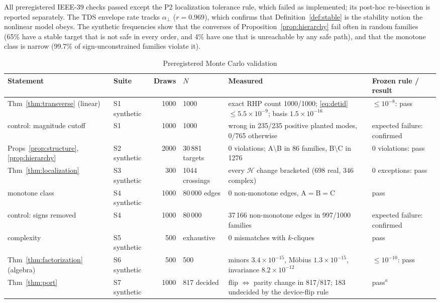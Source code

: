 \documentclass[journal]{IEEEtran}
\theoremstyle{definition}
\theoremstyle{remark}
\newcommand{\Hy}{\mathcal{H}}
\newcommand{\aperp}{\alpha_{\perp}}
\begin{document}
All preregistered IEEE-39 checks passed except the P2 localization tolerance
rule, which failed as implemented; its post-hoc re-bisection is reported
separately. \PtwoText{} The TDS envelope rate tracks $\aperp$ ($r=0.969$),
which confirms that Definition~\ref{def:stable} is the stability notion the
nonlinear model obeys. The synthetic frequencies show that the converses of
Proposition~\ref{prop:hierarchy} fail often in random families (65\% have a
stable target that is not safe in every order, and 4\% have one that is
unreachable by any safe path), and that the monotone class is narrow (99.7\% of
sign-unconstrained families violate it).

\begin{table}[!t]
\centering
\caption{Preregistered Monte Carlo validation}\label{tab:mc}
\setlength{\tabcolsep}{3.5pt}
\footnotesize
\begin{tabular}{@{}L{2.7cm}L{1.75cm}rL{1.45cm}L{6.35cm}L{3.0cm}@{}}
\toprule
Statement & Suite & Draws & $N$ & Measured & Frozen rule / result \\
\midrule
Thm~\ref{thm:transverse} (linear) & S1 synthetic & 1000 & 1000 & exact RHP count 1000/1000; \eqref{eq:detid} $\le 5.5\!\times\!10^{-9}$; basis $1.5\!\times\!10^{-16}$ & $\le 10^{-8}$: pass\\
\quad control: magnitude cutoff & S1 & 1000 & 1000 & wrong in 235/235 positive planted modes, 0/765 otherwise & expected failure: confirmed\\
Props~\ref{prop:structure},\ref{prop:hierarchy} & S2 synthetic & 2000 & 30\,881 targets & 0 violations; A$\setminus$B in 86 families, B$\setminus$C in 1276 & 0 violations: pass\\
Thm~\ref{thm:localization} & S3 synthetic & 300 & 1044 crossings & every $\Hy$ change bracketed (698 real, 346 complex) & 0 exceptions: pass\\
monotone class & S4 synthetic & 1000 & 80\,000 edges & 0 non-monotone edges, A$=$B$=$C & pass\\
\quad control: signs removed & S4 & 1000 & 80\,000 & 37\,166 non-monotone edges in 997/1000 families & expected failure: confirmed\\
complexity & S5 synthetic & 500 & exhaustive & 0 mismatches with $k$-cliques & pass\\
Thm~\ref{thm:factorization} (algebra) & S6 synthetic & 500 & 500 & minors $3.4\!\times\!10^{-15}$, M\"obius $1.3\!\times\!10^{-15}$, invariance $8.2\!\times\!10^{-12}$ & $\le 10^{-10}$: pass\\
Thm~\ref{thm:port} & S7 synthetic & 1000 & 817 decided & flip $\Leftrightarrow$ parity change in 817/817; 183 undecided by the device-flip rule & pass$^{a}$\\

\end{tabular}
\end{table}
\end{document}
